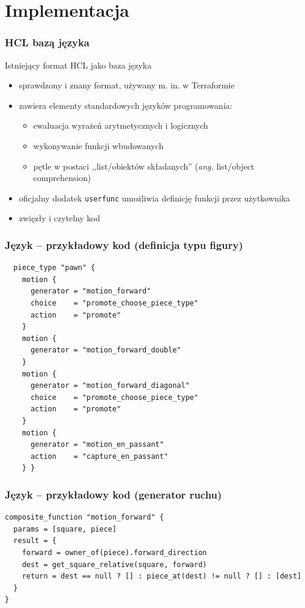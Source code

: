 \documentclass{beamer}
\begin{document}
\section{Implementacja}

\begin{frame}
	\frametitle{HCL bazą języka}
	Istniejący format HCL jako baza języka
	\begin{itemize}
		\item sprawdzony i znany format, używany m. in. w Terraformie\footnotemark
		\item zawiera elementy standardowych języków programowania:
		      \begin{itemize}
			      \item ewaluacja wyrażeń arytmetycznych i logicznych
			      \item wykonywanie funkcji wbudowanych
			      \item pętle w postaci ,,list/obiektów składanych'' (\emph{ang.} list/object comprehension)
		      \end{itemize}
		\item oficjalny dodatek {\tt userfunc} umożliwia definicję funkcji przez użytkownika
		\item zwięzły i czytelny kod
	\end{itemize}
\end{frame}

\begin{frame}[fragile]
	\frametitle{Język -- przykładowy kod (definicja typu figury)}

	\begin{lstlisting}
  piece_type "pawn" {
    motion {
      generator = "motion_forward"
      choice    = "promote_choose_piece_type"
      action    = "promote"
    }
    motion {
      generator = "motion_forward_double"
    }
    motion {
      generator = "motion_forward_diagonal"
      choice    = "promote_choose_piece_type"
      action    = "promote"
    }
    motion {
      generator = "motion_en_passant"
      action    = "capture_en_passant"
    } }
	\end{lstlisting}
\end{frame}

\begin{frame}[fragile]
	\frametitle{Język -- przykładowy kod (generator ruchu)}

	\begin{lstlisting}
composite_function "motion_forward" {
  params = [square, piece]
  result = {
    forward = owner_of(piece).forward_direction
    dest = get_square_relative(square, forward)
    return = dest == null ? [] : piece_at(dest) != null ? [] : [dest]
  }
}
    \end{lstlisting}
\end{frame}
\end{document}
